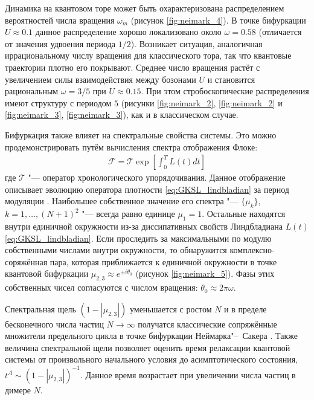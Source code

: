 Динамика на квантовом торе может быть охарактеризована распределением вероятностей числа вращения $\omega_m$ (рисунок \cref{fig:neimark_4}). 
В точке бифуркации $U \approx 0.1$ данное распределение хорошо локализовано около $\omega = 0.58$ (отличается от значения удвоения периода $1/2$). 
Возникает ситуация, аналогичная иррациональному числу вращения для классического тора, так что квантовые траектории плотно его покрывают.
Среднее число вращения растёт с увеличением силы взаимодействия между бозонами \(U\) и становится рациональным $\omega = 3/5$ при $U \approx 0.15$.
При этом стробоскопические распределения имеют структуру с периодом $5$ (рисунки \cref{fig:neimark_2}, \cref{fig:neimark_2} и \cref{fig:neimark_3}, \cref{fig:neimark_3}), как и в классическом случае.

Бифуркация также влияет на спектральные свойства системы.
Это можно продемонстрировать путём вычисления спектра отображения Флоке:
\begin{equation}
	\label{eq:neimark_floquet}
	\begin{gathered}
		\mathcal{F} = \mathcal{T} \exp \left[ \int_0^T L(t) dt \right]
	\end{gathered}
\end{equation}
где $\mathcal{T}$ "--- оператор хронологического упорядочивания.
Данное отображение описывает эволюцию оператора плотности \cref{eq:GKSL_lindbladian} за период модуляции \cite{Hartmann2017}.
Наибольшее собственное значение его спектра "--- $\{ \mu_k \}$, $k = 1, \ldots, (N+1)^2 $ "--- всегда равно единице $\mu_1 = 1$.
Остальные находятся внутри единичной окружности из-за диссипативных свойств Линдбладиана $L(t)$ \cref{eq:GKSL_lindbladian}. 
Если проследить за максимальными по модулю собственными числами внутри окружности, то обнаружится комплексно-соряжённая пара, которая приближается к единичной окружности в точке квантовой бифуркации
$\mu_{2,3} \approx e^{\pm i \theta_0}$ (рисунок \cref{fig:neimark_5}).
Фазы этих собственных чисел согласуются с числом вращения: $\theta_0 \approx 2 \pi \omega$.

Спектральная щель $(1 - |\mu_{2,3}|)$ уменьшается с ростом $N$ и в пределе бесконечного числа частиц $N\to\infty$ получатся классические сопряжённые множители предельного цикла в точке бифуркации Неймарка"--~Сакера \cite {Kuznetsov2004}.
Также величина спектральной щели позволяет оценить время релаксации квантовой системы от произвольного начального условия до асимптотического состояния, $t^A \sim (1-|\mu_{2,3}|)^{-1}$. Данное время возрастает при увеличении числа частиц в димере $N$.

